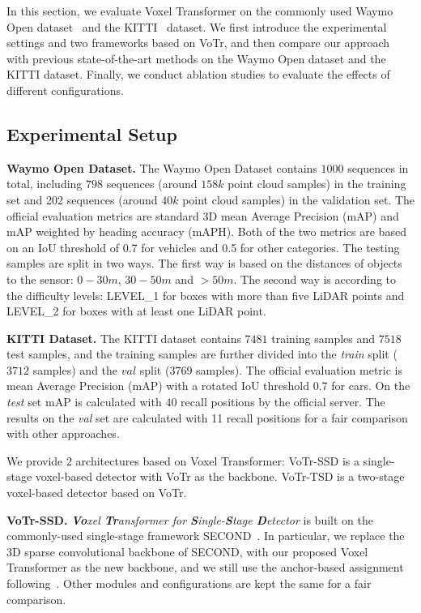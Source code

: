 \documentclass[10pt,twocolumn,letterpaper]{article}
\begin{document}
In this section, we evaluate Voxel Transformer on the commonly used Waymo Open dataset~\cite{sun2020scalability} and the KITTI~\cite{geiger2013vision} dataset. We first introduce the experimental settings and two frameworks based on VoTr, and then compare our approach with previous state-of-the-art methods on the Waymo Open dataset and the KITTI dataset. Finally, we conduct ablation studies to evaluate the effects of different configurations.

\subsection{Experimental Setup} \label{Experimental Setup}
\noindent\textbf{Waymo Open Dataset.} The Waymo Open Dataset contains $1000$ sequences in total, including $798$ sequences (around $158k$ point cloud samples) in the training set and 202 sequences (around $40k$ point cloud samples) in the validation set. The official evaluation metrics are standard 3D mean Average Precision (mAP) and mAP weighted by heading accuracy (mAPH). Both of the two metrics are based on an IoU threshold of 0.7 for vehicles and 0.5 for other categories. The testing samples are split in two ways. The first way is based on the distances of objects to the sensor: $0-30m$, $30-50m$ and $>50m$. The second way is according to the difficulty levels: LEVEL\_1 for boxes with more than five LiDAR points and LEVEL\_2 for boxes with at least one LiDAR point.

\noindent\textbf{KITTI Dataset.} The KITTI dataset contains $7481$ training samples and $7518$ test samples, and the training samples are further divided into the \textit{train} split ($3712$ samples) and the $val$ split ($3769$ samples). The official evaluation metric is mean Average Precision (mAP) with a rotated IoU threshold 0.7 for cars. On the \textit{test} set mAP is calculated with $40$ recall positions by the official server. The results on the \textit{val} set are calculated with 11 recall positions for a fair comparison with other approaches.

We provide $2$ architectures based on Voxel Transformer: VoTr-SSD is a single-stage voxel-based detector with VoTr as the backbone. VoTr-TSD is a two-stage voxel-based detector based on VoTr.

\noindent\textbf{VoTr-SSD.} \textit{\textbf{Vo}xel \textbf{Tr}ansformer for \textbf{S}ingle-\textbf{S}tage \textbf{D}etector} is built on the commonly-used single-stage framework SECOND~\cite{yan2018second}. In particular, we replace the 3D sparse convolutional backbone of SECOND, with our proposed Voxel Transformer as the new backbone, and we still use the anchor-based assignment following~\cite{yan2018second}. Other modules and configurations are kept the same for a fair comparison.
\end{document}
